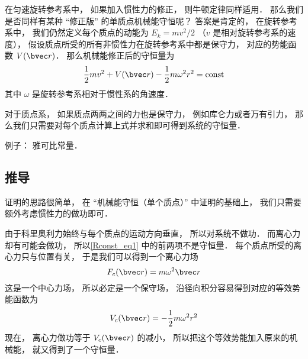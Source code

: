 

在匀速旋转参考系中， 如果加入惯性力的修正， 则牛顿定律同样适用． 那么我们是否同样有某种 “修正版” 的单质点机械能守恒呢？ 答案是肯定的， 在旋转参考系中， 我们仍然定义每个质点的动能为 $E_k = mv^2/2$ （$v$ 是相对旋转参考系的速度）， 假设质点所受的所有非惯性力在旋转参考系中都是保守力， 对应的势能函数 $V(\bvec r)$． 那么机械能修正后的守恒量为
\begin{equation}\label{Rconst_eq1}
\frac{1}{2}m v^2 + V(\bvec r) - \frac{1}{2}m\omega^2 r^2 = \text{const}
\end{equation}
其中 $\omega$ 是旋转参考系相对于惯性系的角速度．

对于质点系， 如果质点两两之间的力也是保守力， 例如库仑力或者万有引力， 那么我们只需要对每个质点计算上式并求和即可得到系统的守恒量．

例子： 雅可比常量．

\subsection{推导}
证明的思路很简单， 在 “机械能守恒（单个质点）” 中证明的基础上， 我们只需要额外考虑惯性力的做功即可．

由于科里奥利力始终与每个质点的运动方向垂直， 所以对系统不做功． 而离心力却有可能会做功， 所以\autoref{Rconst_eq1} 中的前两项不是守恒量． 每个质点所受的离心力只与位置有关， 于是我们可以得到一个离心力场
\begin{equation}
F_c(\bvec r) = m\omega^2 \bvec r
\end{equation}
 这是一个中心力场， 所以必定是一个保守场， 沿径向积分容易得到对应的等效势能函数为
\begin{equation}
V_c(\bvec r) = -\frac{1}{2}m\omega^2 r^2
\end{equation}
现在， 离心力做功等于 $V_c(\bvec r)$ 的减小， 所以把这个等效势能加入原来的机械能， 就又得到了一个守恒量．

